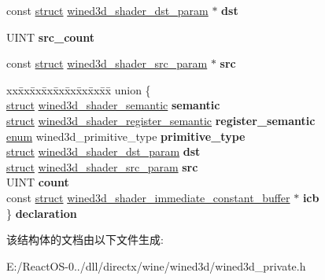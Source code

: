 \begin{DoxyCompactItemize}
const \hyperlink{interfacestruct}{struct} \hyperlink{structwined3d__shader__dst__param}{wined3d\+\_\+shader\+\_\+dst\+\_\+param} $\ast$ {\bfseries dst}
\item 
\mbox{\label{structwined3d__shader__instruction_ab6d3803981c4ddff06c64014377577a7}} 
U\+I\+NT {\bfseries src\+\_\+count}
\item 
\mbox{\label{structwined3d__shader__instruction_a3877e4e6ca8b94d667650d37dbba4e89}} 
const \hyperlink{interfacestruct}{struct} \hyperlink{structwined3d__shader__src__param}{wined3d\+\_\+shader\+\_\+src\+\_\+param} $\ast$ {\bfseries src}
\item 
\mbox{\label{structwined3d__shader__instruction_a61d7dd18efbf069a67025ac9c206231b}} 
\begin{tabbing}
xx\=xx\=xx\=xx\=xx\=xx\=xx\=xx\=xx\=\kill
union \{\\
\>\hyperlink{interfacestruct}{struct} \hyperlink{structwined3d__shader__semantic}{wined3d\_shader\_semantic} {\bfseries semantic}\\
\>\hyperlink{interfacestruct}{struct} \hyperlink{structwined3d__shader__register__semantic}{wined3d\_shader\_register\_semantic} {\bfseries register\_semantic}\\
\>\hyperlink{interfaceenum}{enum} wined3d\_primitive\_type {\bfseries primitive\_type}\\
\>\hyperlink{interfacestruct}{struct} \hyperlink{structwined3d__shader__dst__param}{wined3d\_shader\_dst\_param} {\bfseries dst}\\
\>\hyperlink{interfacestruct}{struct} \hyperlink{structwined3d__shader__src__param}{wined3d\_shader\_src\_param} {\bfseries src}\\
\>UINT {\bfseries count}\\
\>const \hyperlink{interfacestruct}{struct} \hyperlink{structwined3d__shader__immediate__constant__buffer}{wined3d\_shader\_immediate\_constant\_buffer} $\ast$ {\bfseries icb}\\
\} {\bfseries declaration}\\

\end{tabbing}\end{DoxyCompactItemize}


该结构体的文档由以下文件生成\+:\begin{DoxyCompactItemize}
\item 
E\+:/\+React\+O\+S-\/0../dll/directx/wine/wined3d/wined3d\+\_\+private.\+h\end{DoxyCompactItemize}
